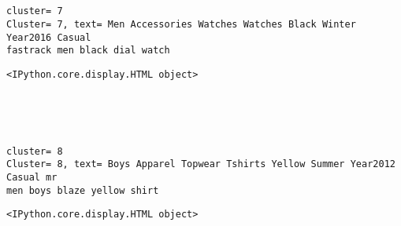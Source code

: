 \documentclass[11pt]{article}
\begin{document}
    
    \begin{center}
    \end{center}
    { \hspace*{\fill} \\}
    
    \begin{center}
    \end{center}
    { \hspace*{\fill} \\}
    
    \begin{Verbatim}[commandchars=\\\{\}]
cluster= 7
Cluster= 7, text= Men Accessories Watches Watches Black Winter Year2016 Casual
fastrack men black dial watch
    \end{Verbatim}

    
    \begin{Verbatim}[commandchars=\\\{\}]
<IPython.core.display.HTML object>
    \end{Verbatim}

    
    \begin{center}
    \end{center}
    { \hspace*{\fill} \\}
    
    \begin{center}
    \end{center}
    { \hspace*{\fill} \\}
    
    \begin{Verbatim}[commandchars=\\\{\}]
cluster= 8
Cluster= 8, text= Boys Apparel Topwear Tshirts Yellow Summer Year2012 Casual mr
men boys blaze yellow shirt
    \end{Verbatim}

    
    \begin{Verbatim}[commandchars=\\\{\}]
<IPython.core.display.HTML object>
    \end{Verbatim}

    
    \begin{center}
    \end{center}
    { \hspace*{\fill} \\}
    
\end{document}
